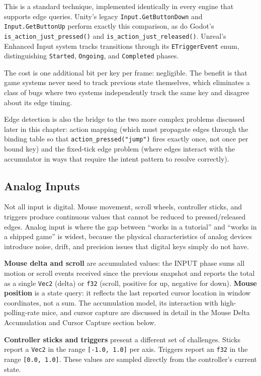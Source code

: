 \documentclass[
  11pt,
  letterpaper,
  DIV=11,
  numbers=noendperiod,
  twoside,
  open=right]{scrreprt}
\begin{document}
This is a standard technique, implemented identically in every engine
that supports edge queries. Unity's legacy \texttt{Input.GetButtonDown}
and \texttt{Input.GetButtonUp} perform exactly this comparison, as do
Godot's \texttt{is\_action\_just\_pressed()} and
\texttt{is\_action\_just\_released()}. Unreal's Enhanced Input system
tracks transitions through its \texttt{ETriggerEvent} enum,
distinguishing \texttt{Started}, \texttt{Ongoing}, and
\texttt{Completed} phases.

The cost is one additional bit per key per frame: negligible. The
benefit is that game systems never need to track previous state
themselves, which eliminates a class of bugs where two systems
independently track the same key and disagree about its edge timing.

Edge detection is also the bridge to the two more complex problems
discussed later in this chapter: action mapping (which must propagate
edges through the binding table so that \texttt{action\_pressed("jump")}
fires exactly once, not once per bound key) and the fixed-tick edge
problem (where edges interact with the accumulator in ways that require
the intent pattern to resolve correctly).

\subsection{Analog Inputs}\label{analog-inputs}

Not all input is digital. Mouse movement, scroll wheels, controller
sticks, and triggers produce continuous values that cannot be reduced to
pressed/released edges. Analog input is where the gap between ``works in
a tutorial'' and ``works in a shipped game'' is widest, because the
physical characteristics of analog devices introduce noise, drift, and
precision issues that digital keys simply do not have.

\textbf{Mouse delta and scroll} are accumulated values: the INPUT phase
sums all motion or scroll events received since the previous snapshot
and reports the total as a single \texttt{Vec2} (delta) or \texttt{f32}
(scroll, positive for up, negative for down). \textbf{Mouse position} is
a state query: it reflects the last reported cursor location in window
coordinates, not a sum. The accumulation model, its interaction with
high-polling-rate mice, and cursor capture are discussed in detail in
the Mouse Delta Accumulation and Cursor Capture section below.

\textbf{Controller sticks and triggers} present a different set of
challenges. Sticks report a \texttt{Vec2} in the range
\texttt{{[}-1.0,\ 1.0{]}} per axis. Triggers report an \texttt{f32} in
the range \texttt{{[}0.0,\ 1.0{]}}. These values are sampled directly
from the controller's current state.
\end{document}
